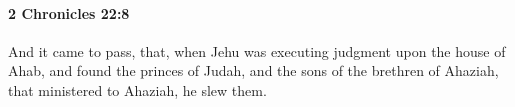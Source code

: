 
		\paragraph{2 Chronicles 22:8} %
			\label{2CHRONICLES-22-8}

			And it came to pass, that, when Jehu was executing judgment upon the house of Ahab, and found the princes of Judah, and the sons of the brethren of Ahaziah, that ministered to Ahaziah, he slew them.


